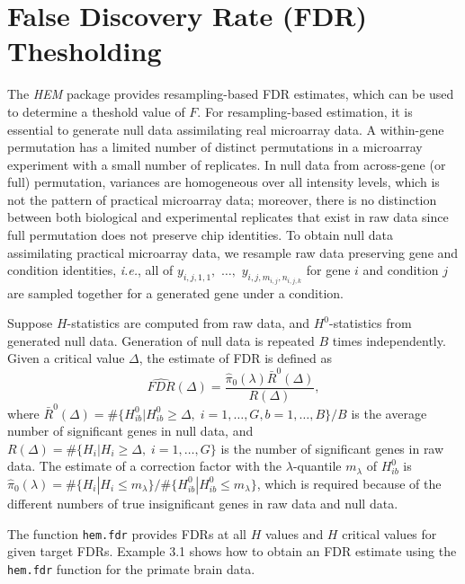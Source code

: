 \documentclass[12pt]{article}
\newcommand{\Rfunction}[1]{{\texttt{#1}}}
\newcommand{\Rpackage}[1]{{\textit{#1}}}
\begin{document}
\section{False Discovery Rate (FDR) Thesholding}
The \Rpackage{HEM} package provides resampling-based FDR estimates, which can be used to determine a theshold value of $F$.
For resampling-based estimation, it is essential to generate null data assimilating real microarray data.
A within-gene permutation has a limited number of distinct permutations in a microarray experiment  
with a small number of replicates.
In null data from across-gene (or full) permutation, variances are homogeneous over all intensity levels, 
which is not the pattern of practical microarray data; moreover, 
there is no distinction between both biological and experimental replicates that exist in raw data
since full permutation does not preserve chip identities. 
To obtain null data assimilating practical microarray data, we resample raw data preserving gene and condition identities, 
{\it i.e.},  all of $y_{i,j,1,1},$ $\ldots,$ $y_{i,j,m_{i,j},n_{i,j,k}}$ for gene $i$ and condition $j$ are sampled together 
for a generated gene under a condition.

Suppose $H$-statistics are computed from raw data, 
and $H^0$-statistics from generated null data. 
Generation of null data is repeated $B$ times independently.
Given a critical value $\Delta$, the estimate of FDR is defined as 
\begin{equation}\label{eq:FDRest}
\widehat{FDR}(\Delta) =  \frac{ \hat{\pi}_0(\lambda) \bar{R}^0(\Delta)}{R(\Delta)},
\end{equation}
where 
$\bar{R}^0(\Delta) = \# \{H^0_{ib}| H^0_{ib} \ge \Delta, \; i=1,\ldots,G, b=1,\ldots,B  \} / B$ is 
the average number of significant genes in null data,
and $R(\Delta) = \# \{H_i| H_i \ge \Delta, \; i=1,\ldots,G  \}$ is the number of significant genes in raw data.
The estimate of a correction factor with the $\lambda$-quantile $m_\lambda$ of $H^0_{ib}$ is
$\hat{\pi}_0(\lambda) = \# \{H_i| H_i \le m_\lambda  \}/\# \{H^0_{ib}| H^0_{ib} \le m_\lambda  \}$,
which is required because of the different numbers of true insignificant genes in raw data and null data.  

The function \Rfunction{hem.fdr} provides FDRs at all $H$ values and $H$ critical values for given target FDRs.  
Example 3.1 shows how to obtain an FDR estimate using the \Rfunction{hem.fdr} function for the  primate brain data.
\end{document}

